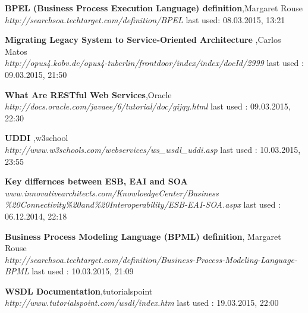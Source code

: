 \documentclass[12pt]{article}
\begin{document}
\begin{thebibliography}{56}
     
  
     
    


     


   \textbf{BPEL (Business Process Execution Language) definition},Margaret Rouse \\
  \textit{http://searchsoa.techtarget.com/definition/BPEL}
  \newline last used: 08.03.2015, 13:21

    \textbf{Migrating Legacy System to Service-Oriented Architecture },Carlos Matos\\
    \textit{http://opus4.kobv.de/opus4-tuberlin/frontdoor/index/index/docId/2999}
    \newline last used : 09.03.2015, 21:50

    \textbf{What Are RESTful Web Services},Oracle \\
    \textit{http://docs.oracle.com/javaee/6/tutorial/doc/gijqy.html}
    \newline last used : 09.03.2015, 22:30

    \textbf{UDDI },w3school\\
    \textit{http://www.w3schools.com/webservices/ws\_wsdl\_uddi.asp}
    \newline last used : 10.03.2015, 23:55

  


   \textbf{Key differnces between ESB, EAI and SOA}\\
  \textit{www.innovativearchitects.com/KnowloedgeCenter/Business \\ \%20Connectivity\%20and\%20Interoperability/ESB-EAI-SOA.aspx}
  \newline last used : 06.12.2014, 22:18



 	
   	  
   \textbf{Business Process Modeling Language (BPML) definition}, Margaret Rouse\\
  \textit{http://searchsoa.techtarget.com/definition/Business-Process-Modeling-Language-BPML}
  \newline last used : 10.03.2015, 21:09

   	\textbf{WSDL Documentation},tutorialspoint \\
    \textit{http://www.tutorialspoint.com/wsdl/index.htm}
    \newline last used : 19.03.2015, 22:00


\end{thebibliography}
\end{document}
